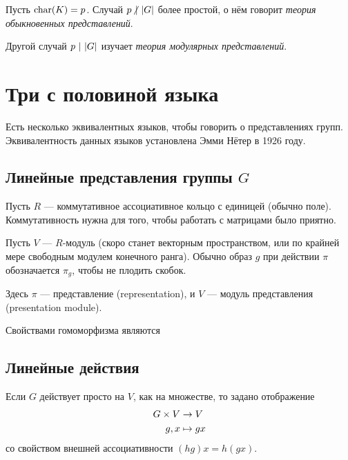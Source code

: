 Пусть $\operatorname{char}(K) = p$.
Случай $p \;\!{\not|}~ |G|$ более простой, о нём говорит \emph{теория обыкновенных представлений}.

Другой случай $p ~|~ |G|$ изучает \emph{теория модулярных представлений}.


\section{Три с половиной языка}
Есть несколько эквивалентных языков, чтобы говорить о представлениях групп.
Эквивалентность данных языков установлена Эмми Нётер в 1926 году.

\subsection{Линейные представления группы $G$}
Пусть $R$ --- коммутативное ассоциативное кольцо с единицей (обычно поле).
Коммутативность нужна для того, чтобы работать с матрицами было приятно.

Пусть $V$ --- $R$-модуль (скоро станет векторным пространством, или по крайней мере свободным модулем конечного ранга).
Обычно образ $g$ при действии $\pi$ обозначается $\pi_g$, чтобы не плодить скобок.

Здесь $\pi$ --- представление (representation), и $V$ --- модуль представления (presentation module).

Свойствами гомоморфизма являются

\subsection{Линейные действия}
Если $G$ действует просто на $V$, как на множестве, то задано отображение
\begin{align*}
    G \times V &\rightarrow V \\ g,x&\mapsto gx
\end{align*}
со свойством внешней ассоциативности $(hg)x = h(gx)$.

